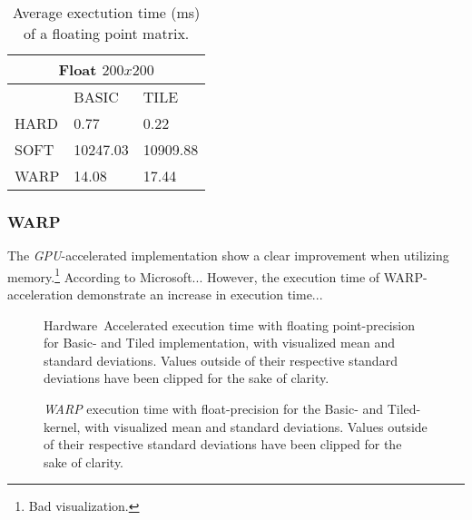 \documentclass[fleqn,10pt]{SelfArx} %
\begin{document}
\begin{table}
\begin{center}
	\begin{tabular}{|l|l|l|}
		\hline
		\multicolumn{3}{|c|}{Float $200x200$} \\
		\hline
		~    & BASIC & TILE \\	\hline
		HARD & 0.77     	& 0.22    		\\	\hline
		SOFT & 10247.03     & 10909.88    	\\	\hline
		WARP & 14.08     	& 17.44    		\\	\hline
	\end{tabular}
	\label{tab:contribution:results:summaryfloat}
	\caption{Average exectution time (ms) of a floating point matrix.}
\end{center}
\end{table}


\subsubsection{WARP}
\label{sec:contribution:results:warp}
The \textit{GPU}-accelerated implementation show a clear improvement when utilizing memory.\footnote{Bad visualization.} According to Microsoft... However, the execution time of WARP-acceleration demonstrate an increase in execution time...
\begin{figure}[htb]
\begin{center}
	\resizebox{ \textwidth/2 }{!}{}
	\caption{Hardware~Accelerated execution time with floating point-precision for Basic- and Tiled implementation, with visualized mean and standard deviations. Values outside of their respective standard deviations have been clipped for the sake of clarity.}
	\label{fig:contribution:results:warp:msshard}
\end{center}
\end{figure}

\begin{figure}[htb]
\begin{center}
	\resizebox{ \textwidth/2 }{!}{}
	\caption{\textit{WARP} execution time with float-precision for the Basic- and Tiled-kernel, with visualized mean and standard deviations. Values outside of their respective standard deviations have been clipped for the sake of clarity.}
	\label{fig:contribution:results:warp:msswarp}
\end{center}
\end{figure}
\end{document}
